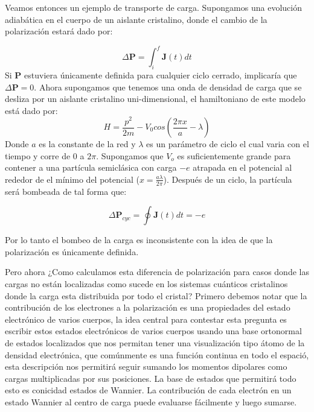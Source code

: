 Veamos entonces un ejemplo de transporte de carga. Supongamos una evolución adiabática en el cuerpo de un aislante cristalino, donde el cambio de la polarización estará dado por:

\begin{equation}
    \Delta \textbf{P} = \int_i^f \textbf{J}(t)dt
\end{equation}
Si \textbf{P} estuviera únicamente definida para cualquier ciclo cerrado, implicaría que  $\Delta \textbf{P} = 0$. Ahora supongamos que tenemos una onda de densidad de carga que se desliza por un aislante cristalino uni-dimensional, el hamiltoniano de este modelo está dado por:
\begin{equation}
    H =  \frac{p^2}{2m} - V_0 cos(\frac{2\pi x}{a} - \lambda)
\end{equation}
Donde $a$ es la constante de la red y $\lambda$ es un parámetro de ciclo el cual varia con el tiempo y corre de $0$ a $2\pi$. 
Supongamos que $V_o$ es suficientemente grande para contener a una partícula semiclásica con carga $-e$ atrapada en el potencial al rededor de el mínimo del potencial ($x = \frac{a\lambda}{2\pi}$). Después de un ciclo, la partícula será bombeada de tal forma que:

\begin{equation}
    \Delta \textbf{P}_{cyc} = \oint \textbf{J}(t)dt = -e
\end{equation}

Por lo tanto el bombeo de la carga es inconsistente con la idea de que la polarización es únicamente  definida. 

Pero ahora ¿Como calculamos esta diferencia de polarización para casos donde las cargas no están localizadas como sucede en los sistemas cuánticos cristalinos donde la carga esta distribuida por todo el cristal? Primero debemos notar que la contribución de los electrones a la polarización es una propiedades del estado electrónico de varios cuerpos, la idea central para contestar esta pregunta es escribir estos estados electrónicos de varios cuerpos usando una base ortonormal  de estados localizados que nos permitan tener una visualización tipo átomo de la densidad electrónica, que comúnmente es una función continua en todo el espació, esta descripción nos permitirá seguir sumando los momentos dipolares como cargas multiplicadas por sus posiciones. La base de estados que permitirá todo esto es conicidad estados de Wannier. La contribución de cada electrón en un estado Wannier al centro de carga puede evaluarse fácilmente y luego sumarse.

